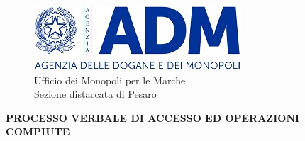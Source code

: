 \documentclass[12pt]{article}
\begin{document}
\thispagestyle{empty}

\begin{figure}[h]
    \centering
    \includegraphics{logo-adm.jpg}
    \caption*{Ufficio dei Monopoli per le Marche\\Sezione distaccata di Pesaro}
    \label{fig:logoadm}
\end{figure}

{\centering
    \textbf{PROCESSO VERBALE DI ACCESSO ED OPERAZIONI COMPIUTE}
    \par
}
\end{document}
